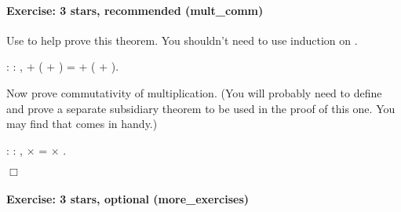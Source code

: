 \documentclass[12pt]{report}
\begin{document}
\paragraph{Exercise: 3 stars, recommended (mult\_comm)}

 Use  to help prove this theorem.  You shouldn't need to
    use induction on . \begin{coqdoccode}
\coqdocemptyline
\coqdocnoindent
{}  : \coqdockw{\ensuremath{\forall}}    : ,\coqdoceol
\coqdocindent{1.00em}
 + ( + ) =  + ( + ).\coqdoceol
 \coqdocemptyline
\end{coqdoccode}
Now prove commutativity of multiplication.  (You will probably
    need to define and prove a separate subsidiary theorem to be used
    in the proof of this one.  You may find that  comes in
    handy.) \begin{coqdoccode}
\coqdocemptyline
\coqdocnoindent
{}  : \coqdockw{\ensuremath{\forall}}   : ,\coqdoceol
\coqdocindent{1.00em}
 \ensuremath{\times}  =  \ensuremath{\times} .\coqdoceol
 \end{coqdoccode}
\ensuremath{\Box} 

\paragraph{Exercise: 3 stars, optional (more\_exercises)}
\end{document}
